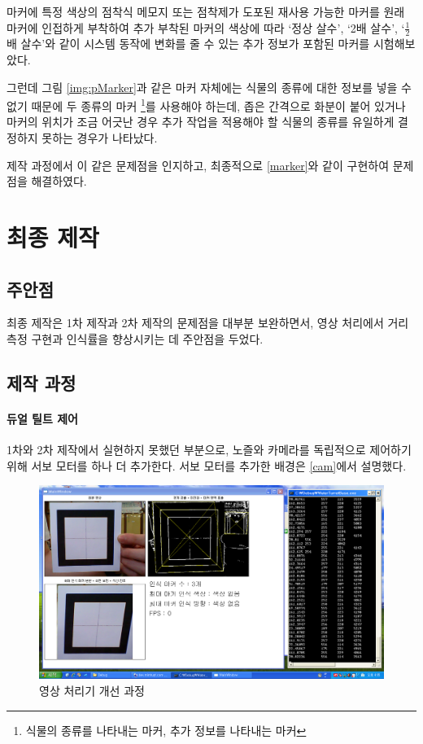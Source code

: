 \documentclass[chapter,11pt,oneside,openany]{xoblivoir}
\begin{document}
마커에 특정 색상의 점착식 메모지 또는 점착제가 도포된 재사용 가능한 마커를
원래 마커에 인접하게 부착하여 추가 부착된 마커의 색상에 따라
`정상 살수', `2배 살수', `$\frac{1}{2}$배 살수'와 같이
시스템 동작에 변화를 줄 수 있는 추가 정보가 포함된 마커를 시험해보았다.

그런데 그림 \ref{img:pMarker}과 같은 마커 자체에는 식물의 종류에 대한 정보를
넣을 수 없기 때문에 두 종류의 마커
\footnote{식물의 종류를 나타내는 마커, 추가 정보를 나타내는 마커}를 사용해야 하는데,
좁은 간격으로 화분이 붙어 있거나 마커의 위치가 조금 어긋난 경우
추가 작업을 적용해야 할 식물의 종류를 유일하게 결정하지 못하는 경우가 나타났다.

제작 과정에서 이 같은 문제점을 인지하고,
최종적으로 \ref{marker}와 같이 구현하여 문제점을 해결하였다.



\section{최종 제작}

\subsection{주안점}
최종 제작은 1차 제작과 2차 제작의 문제점을 대부분 보완하면서,
영상 처리에서 거리 측정 구현과 인식률을 향상시키는 데 주안점을 두었다.

\subsection{제작 과정}

\paragraph{듀얼 틸트 제어}
1차와 2차 제작에서 실현하지 못했던 부분으로, 노즐와 카메라를 독립적으로 제어하기 위해
서보 모터를 하나 더 추가한다. 서보 모터를 추가한 배경은 \ref{cam}에서 설명했다.

\begin{figure}[ht]
\centering
\includegraphics[width=\textwidth]{img/dev}
\caption{영상 처리기 개선 과정}
\label{img:dev}
\end{figure}
\end{document}
